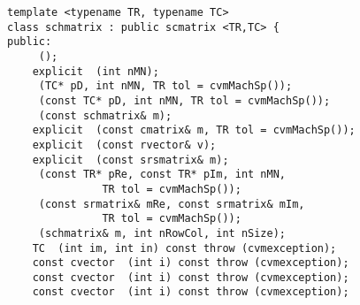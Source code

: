 \bigskip
\noindent
\verb"template <typename TR, typename TC>"\\
\verb"class schmatrix : public scmatrix <TR,TC> {"\\
\verb"public:"\\
\verb"    "\verb" ();"\\
\verb"    explicit "\verb" (int nMN);"\\
\verb"    "\verb" (TC* pD, int nMN, TR tol = cvmMachSp());"\\
\verb"    "\verb" (const TC* pD, int nMN, TR tol = cvmMachSp());"\\
\verb"    "\verb" (const schmatrix& m);"\\
\verb"    explicit "\verb" (const cmatrix& m, TR tol = cvmMachSp());"\\
\verb"    explicit "\verb" (const rvector& v);"\\
\verb"    explicit "\verb" (const srsmatrix& m);"\\
\verb"    "\verb" (const TR* pRe, const TR* pIm, int nMN,"\\
\verb"               TR tol = cvmMachSp());"\\
\verb"    "\verb" (const srmatrix& mRe, const srmatrix& mIm,"\\
\verb"               TR tol = cvmMachSp());"\\
\verb"    "\verb" (schmatrix& m, int nRowCol, int nSize);"\\
\verb"    TC "\verb" (int im, int in) const throw (cvmexception);"\\
\verb"    const cvector "\verb" (int i) const throw (cvmexception);"\\
\verb"    const cvector "\verb" (int i) const throw (cvmexception);"\\
\verb"    const cvector "\verb" (int i) const throw (cvmexception);"\\
